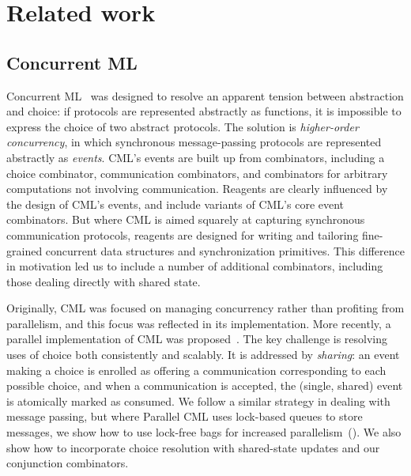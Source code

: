 \documentclass[preprint,nocopyrightspace]{sigplanconf}
\begin{document}

\section{Related work}
\label{sec:related}


\subsection{Concurrent ML}

Concurrent ML~\cite{Reppy1991} was designed to resolve an apparent tension
between abstraction and choice: if protocols are represented abstractly as
functions, it is impossible to express the choice of two abstract protocols.
The solution is \emph{higher-order concurrency}, in which synchronous
message-passing protocols are represented abstractly as \emph{events}.  CML's
events are built up from combinators, including a choice combinator,
communication combinators, and combinators for arbitrary computations not
involving communication.  
Reagents are clearly influenced by the design of CML's events, and include
variants of CML's core event combinators.
But where CML is aimed squarely at capturing synchronous communication
protocols, reagents are designed for writing and tailoring fine-grained
concurrent data structures and synchronization primitives.  This difference in
motivation led us to include a number of additional combinators, including
those dealing directly with shared state.

Originally, CML was focused on managing concurrency rather than profiting from
parallelism, and this focus was reflected in its implementation.  More
recently, a parallel implementation of CML was proposed~\cite{Reppy2009}.  The
key challenge is resolving uses of choice both consistently and scalably.  It
is addressed by \emph{sharing}: an event making a choice is enrolled as
offering a communication corresponding to each possible choice, and when a
communication is accepted, the (single, shared) event is atomically marked as
consumed.  We follow a similar strategy in dealing with message passing, but
where Parallel CML uses lock-based queues to store messages, we show how to
use lock-free bags for increased parallelism~().  We
also show how to incorporate choice resolution with shared-state updates and
our conjunction combinators.
\end{document}
